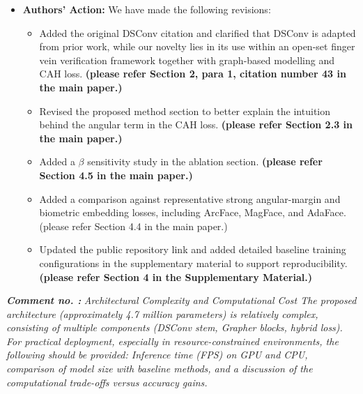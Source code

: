 \documentclass[11pt]{article}
\theoremstyle{remark}
\newcounter{mycounter} %
\newcommand\showReviewcounter{\stepcounter{mycounter}\themycounter}
\begin{document}
\begin{itemize}
	\item \textbf{Authors' Action:} 
	We have made the following revisions:
	\begin{itemize}
	    \item Added the original DSConv citation and clarified that DSConv is adapted from prior work, while our novelty lies in its use within an open-set finger vein verification framework together with graph-based modelling and CAH loss. \textbf{(please refer Section 2, para 1, citation number 43 in the main paper.)}
	    \item Revised the proposed method section to better explain the intuition behind the angular term in the CAH loss. \textbf{(please refer Section 2.3 in the main paper.)}
	    \item Added a $\beta$ sensitivity study in the ablation section. \textbf{(please refer Section 4.5 in the main paper.)}
	    \item Added a comparison against representative strong angular-margin and biometric embedding losses, including ArcFace, MagFace, and AdaFace. (please refer Section 4.4 in the main paper.)
	    \item Updated the public repository link and added detailed baseline training configurations in the supplementary material to support reproducibility. \textbf{(please refer Section 4 in the Supplementary Material.)}
	\end{itemize}
\end{itemize}
\color{blue} 
\textbf{\textit{Comment no. \showReviewcounter:}} 
\textit{Architectural Complexity and Computational Cost
The proposed architecture (approximately 4.7 million parameters) is relatively complex, consisting of multiple components (DSConv stem, Grapher blocks, hybrid loss). For practical deployment, especially in resource-constrained environments, the following should be provided: Inference time (FPS) on GPU and CPU, comparison of model size with baseline methods, and a discussion of the computational trade-offs versus accuracy gains.}
\color{black}
\end{document}
